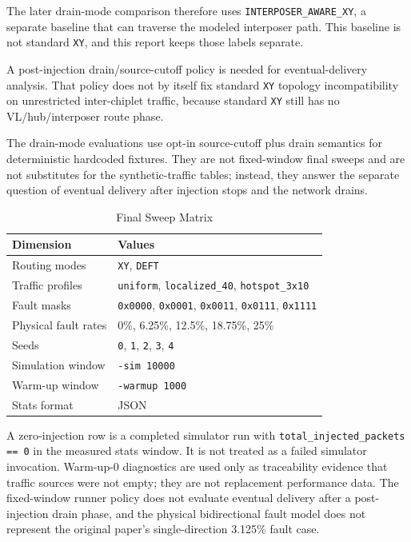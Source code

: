 \documentclass[conference]{IEEEtran}
\begin{document}
The later drain-mode comparison therefore uses \texttt{INTERPOSER\_AWARE\_XY}, a separate baseline that can traverse the modeled interposer path. This baseline is not standard \texttt{XY}, and this report keeps those labels separate.

A post-injection drain/source-cutoff policy is needed for eventual-delivery analysis. That policy does not by itself fix standard \texttt{XY} topology incompatibility on unrestricted inter-chiplet traffic, because standard \texttt{XY} still has no VL/hub/interposer route phase.

The drain-mode evaluations use opt-in source-cutoff plus drain semantics for deterministic hardcoded fixtures. They are not fixed-window final sweeps and are not substitutes for the synthetic-traffic tables; instead, they answer the separate question of eventual delivery after injection stops and the network drains.

\begin{table}[t]
\centering
\caption{Final Sweep Matrix}
\label{tab:setup}
\begin{tabularx}{\columnwidth}{@{}lX@{}}
\toprule
\textbf{Dimension} & \textbf{Values} \\
\midrule
Routing modes & \texttt{XY}, \texttt{DEFT} \\
Traffic profiles & \texttt{uniform}, \texttt{localized\_40}, \texttt{hotspot\_3x10} \\
Fault masks & \texttt{0x0000}, \texttt{0x0001}, \texttt{0x0011}, \texttt{0x0111}, \texttt{0x1111} \\
Physical fault rates & 0\%, 6.25\%, 12.5\%, 18.75\%, 25\% \\
Seeds & \texttt{0}, \texttt{1}, \texttt{2}, \texttt{3}, \texttt{4} \\
Simulation window & \texttt{-sim 10000} \\
Warm-up window & \texttt{-warmup 1000} \\
Stats format & JSON \\
\bottomrule
\end{tabularx}
\end{table}

A zero-injection row is a completed simulator run with \texttt{total\_injected\_packets == 0} in the measured stats window. It is not treated as a failed simulator invocation. Warm-up-0 diagnostics are used only as traceability evidence that traffic sources were not empty; they are not replacement performance data. The fixed-window runner policy does not evaluate eventual delivery after a post-injection drain phase, and the physical bidirectional fault model does not represent the original paper's single-direction 3.125\% fault case.
\end{document}
